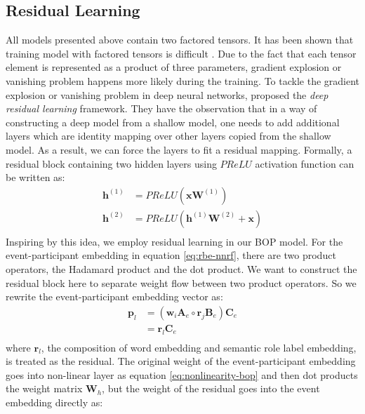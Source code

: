 \documentclass[a4paper]{article}
\begin{document}
\subsection{Residual Learning} \label{sec:residual}
All models presented above contain two factored tensors. It has been shown that training model with factored tensors is difficult \citep{sutskever2011generating, kiros2014multimodal}. Due to the fact that each tensor element is represented as a product of three parameters, gradient explosion or vanishing problem happens more likely during the training. To tackle the gradient explosion or vanishing problem in deep neural networks, \citet{he2016deep} proposed the \textit{deep residual learning} framework. They have the observation that in a way of constructing a deep model from a shallow model, one needs to add additional layers which are identity mapping over other layers copied from the shallow model. As a result, we can force the layers to fit a residual mapping. Formally, a residual block containing two hidden layers using $PReLU$ activation function can be written as: 
\begin{equation} \label{eq:res-block}
\begin{aligned}
    \mathbf{h}^{(1)}
        &= PReLU(\mathbf{x}\mathbf{W}^{(1)}) \\
    \mathbf{h}^{(2)}
        &= PReLU(\mathbf{h}^{(1)}\mathbf{W}^{(2)} + \mathbf{x}) \\
\end{aligned}
\end{equation}
Inspiring by this idea, we employ residual learning in our BOP model. For the event-participant embedding in equation \eqref{eq:rbe-nnrf}, there are two product operators, the Hadamard product and the dot product. We want to construct the residual block here to separate weight flow between two product operators. So we rewrite the event-participant embedding vector as: 
\begin{equation} \label{eq:rbe-bopres}
\begin{aligned}
    \mathbf{p}_l
        &= (\mathbf{w}_i \mathbf{A}_e \circ \mathbf{r}_j \mathbf{B}_e) \mathbf{C}_e \\
        &= \mathbf{r}_l \mathbf{C}_e \\
\end{aligned}
\end{equation}
where $\mathbf{r}_l$, the composition of word embedding and semantic role label embedding, is treated as the residual. The original weight of the event-participant embedding goes into non-linear layer as equation \eqref{eq:nonlinearity-bop} and then dot products the weight matrix $\mathbf{W}_h$, but the weight of the residual goes into the event embedding directly as:
\end{document}
